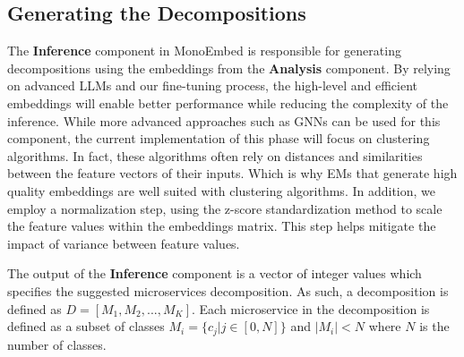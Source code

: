 

\subsection{Generating the Decompositions}\label{subsec:inference}
The \textbf{Inference} component in MonoEmbed is responsible for generating decompositions using the embeddings from the \textbf{Analysis} component. By relying on advanced LLMs and our fine-tuning process, the high-level and efficient embeddings will enable better performance while reducing the complexity of the inference. While more advanced approaches such as GNNs can be used for this component, the current implementation of this phase will focus on clustering algorithms. In fact, these algorithms often rely on distances and similarities between the feature vectors of their inputs. Which is why EMs that generate high quality embeddings are well suited with clustering algorithms. In addition, we employ a normalization step, using the z-score standardization method to scale the feature values within the embeddings matrix. This step helps mitigate the impact of variance between feature values.

The output of the \textbf{Inference} component is a vector of integer values which specifies the suggested microservices decomposition. As such, a decomposition is defined as $D = [M_1, M_2, ..., M_K]$. Each microservice in the decomposition is defined as a subset of classes  $M_i = \{c_j | j \in [0, N]\}$ and $|M_i| < N$ where $N$ is the number of classes.